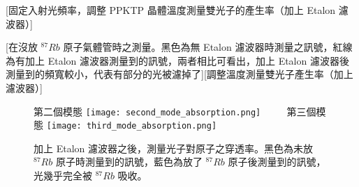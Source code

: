 \documentclass[class=NCU_thesis, crop=false]{standalone}
\begin{document}
[固定入射光頻率，調整 PPKTP 晶體溫度測量雙光子的產生率（加上 Etalon 濾波器）]

[在沒放 $^{87}Rb$ 原子氣體管時之測量。黑色為無 Etalon 濾波器時測量之訊號，紅線為有加上 Etalon 濾波器測量到的訊號，兩者相比可看出，加上 Etalon 濾波器後測量到的頻寬較小，代表有部分的光被濾掉了][調整溫度測量雙光子產生率（加上濾波器）]
\begin{figure}[!hbt]
    \centering
    \subcaptionbox
        {第二個模態
        \label{fig:subfig_fig1}}
        {\texttt{[image: second\_mode\_absorption.png]}}
    ~~~~
    \subcaptionbox
        {第三個模態
        \label{fig:subfig_fig2}}
        {\texttt{[image: third\_mode\_absorption.png]}}
    \caption[加上 Etalon 濾波器之後，光就能完全被原子吸收]{加上 Etalon 濾波器之後，測量光子對原子之穿透率。黑色為未放 $^{87}Rb$ 原子時測量到的訊號，藍色為放了 $^{87}Rb$ 原子後測量到的訊號，光幾乎完全被  $^{87}Rb$ 吸收。}
    \label{fig:absorption_etalon_temp_scanning}
\end{figure}
\end{document}
